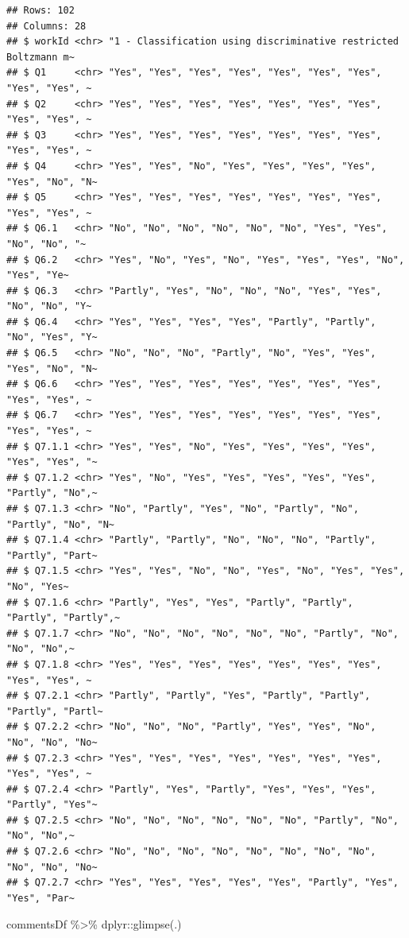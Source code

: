 \documentclass[
]{article}
\newenvironment{Shaded}{\begin{snugshade}}{\end{snugshade}}
\newcommand{\FunctionTok}[1]{\textcolor[rgb]{0.00,0.00,0.00}{#1}}
\newcommand{\NormalTok}[1]{#1}
\newcommand{\SpecialCharTok}[1]{\textcolor[rgb]{0.00,0.00,0.00}{#1}}
\begin{document}
\begin{verbatim}
## Rows: 102
## Columns: 28
## $ workId <chr> "1 - Classification using discriminative restricted Boltzmann m~
## $ Q1     <chr> "Yes", "Yes", "Yes", "Yes", "Yes", "Yes", "Yes", "Yes", "Yes", ~
## $ Q2     <chr> "Yes", "Yes", "Yes", "Yes", "Yes", "Yes", "Yes", "Yes", "Yes", ~
## $ Q3     <chr> "Yes", "Yes", "Yes", "Yes", "Yes", "Yes", "Yes", "Yes", "Yes", ~
## $ Q4     <chr> "Yes", "Yes", "No", "Yes", "Yes", "Yes", "Yes", "Yes", "No", "N~
## $ Q5     <chr> "Yes", "Yes", "Yes", "Yes", "Yes", "Yes", "Yes", "Yes", "Yes", ~
## $ Q6.1   <chr> "No", "No", "No", "No", "No", "No", "Yes", "Yes", "No", "No", "~
## $ Q6.2   <chr> "Yes", "No", "Yes", "No", "Yes", "Yes", "Yes", "No", "Yes", "Ye~
## $ Q6.3   <chr> "Partly", "Yes", "No", "No", "No", "Yes", "Yes", "No", "No", "Y~
## $ Q6.4   <chr> "Yes", "Yes", "Yes", "Yes", "Partly", "Partly", "No", "Yes", "Y~
## $ Q6.5   <chr> "No", "No", "No", "Partly", "No", "Yes", "Yes", "Yes", "No", "N~
## $ Q6.6   <chr> "Yes", "Yes", "Yes", "Yes", "Yes", "Yes", "Yes", "Yes", "Yes", ~
## $ Q6.7   <chr> "Yes", "Yes", "Yes", "Yes", "Yes", "Yes", "Yes", "Yes", "Yes", ~
## $ Q7.1.1 <chr> "Yes", "Yes", "No", "Yes", "Yes", "Yes", "Yes", "Yes", "Yes", "~
## $ Q7.1.2 <chr> "Yes", "No", "Yes", "Yes", "Yes", "Yes", "Yes", "Partly", "No",~
## $ Q7.1.3 <chr> "No", "Partly", "Yes", "No", "Partly", "No", "Partly", "No", "N~
## $ Q7.1.4 <chr> "Partly", "Partly", "No", "No", "No", "Partly", "Partly", "Part~
## $ Q7.1.5 <chr> "Yes", "Yes", "No", "No", "Yes", "No", "Yes", "Yes", "No", "Yes~
## $ Q7.1.6 <chr> "Partly", "Yes", "Yes", "Partly", "Partly", "Partly", "Partly",~
## $ Q7.1.7 <chr> "No", "No", "No", "No", "No", "No", "Partly", "No", "No", "No",~
## $ Q7.1.8 <chr> "Yes", "Yes", "Yes", "Yes", "Yes", "Yes", "Yes", "Yes", "Yes", ~
## $ Q7.2.1 <chr> "Partly", "Partly", "Yes", "Partly", "Partly", "Partly", "Partl~
## $ Q7.2.2 <chr> "No", "No", "No", "Partly", "Yes", "Yes", "No", "No", "No", "No~
## $ Q7.2.3 <chr> "Yes", "Yes", "Yes", "Yes", "Yes", "Yes", "Yes", "Yes", "Yes", ~
## $ Q7.2.4 <chr> "Partly", "Yes", "Partly", "Yes", "Yes", "Yes", "Partly", "Yes"~
## $ Q7.2.5 <chr> "No", "No", "No", "No", "No", "No", "Partly", "No", "No", "No",~
## $ Q7.2.6 <chr> "No", "No", "No", "No", "No", "No", "No", "No", "No", "No", "No~
## $ Q7.2.7 <chr> "Yes", "Yes", "Yes", "Yes", "Yes", "Partly", "Yes", "Yes", "Par~
\end{verbatim}

\begin{Shaded}
\begin{Highlighting}[]
\NormalTok{commentsDf }\SpecialCharTok{\%\textgreater{}\%}\NormalTok{  dplyr}\SpecialCharTok{::}\FunctionTok{glimpse}\NormalTok{(.)}
\end{Highlighting}
\end{Shaded}
\end{document}

